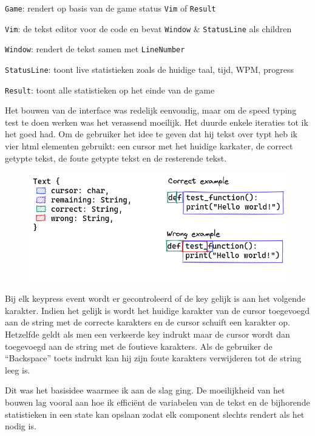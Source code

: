 \texttt{Game}: rendert op basis van de game status \texttt{Vim} of
\texttt{Result} 

\texttt{Vim}: de tekst editor voor de code en bevat \texttt{Window} \&
\texttt{StatusLine} als children 

\texttt{Window}: rendert de tekst samen met \texttt{LineNumber} 

\texttt{StatusLine}: toont live statistieken zoals de huidige taal, tijd, WPM, progress 

\texttt{Result}: toont alle statistieken op het einde van de game

Het bouwen van de interface was redelijk eenvoudig, maar om de speed typing test te doen werken was
het verassend moeilijk. Het duurde enkele iteraties tot ik het goed had. Om de gebruiker het idee te
geven dat hij tekst over typt heb ik vier html elementen gebruikt: een cursor met het huidige
karkater, de correct getypte tekst, de foute getypte tekst en de resterende tekst.

\begin{figure}
  \includegraphics[width=\linewidth]{./figures/text.png}
\end{figure}

Bij elk keypress event wordt er gecontroleerd of de key gelijk is aan het volgende karakter. Indien
het gelijk is wordt het huidige karakter van de cursor toegevoegd aan de string met de correcte
karakters en de cursor schuift een karakter op. Hetzelfde geldt als men een verkeerde key indrukt
maar de cursor wordt dan toegevoegd aan de string met de foutieve karakters. Als de gebruiker de
“Backspace” toets indrukt kan hij zijn foute karakters verwijderen tot de string leeg is. 

\clearpage

Dit was het basisidee waarmee ik aan de slag ging. De moeilijkheid van het bouwen lag vooral aan hoe
ik efficiënt de variabelen van de tekst en de bijhorende statistieken in een state kan opslaan zodat
elk component slechts rendert als het nodig is.  

